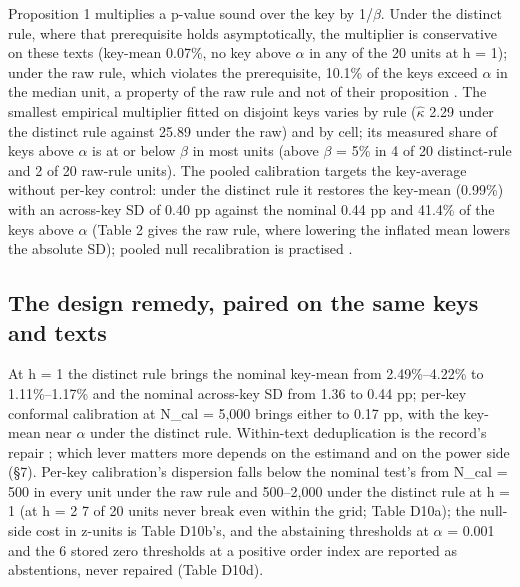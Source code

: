 \documentclass[11pt,letterpaper]{article}
\begin{document}
Proposition 1 multiplies a p-value sound over the key by 1/\ensuremath{\beta}. Under the distinct rule, where that prerequisite holds asymptotically, the multiplier is conservative on these texts (key-mean 0.07\%, no key above \ensuremath{\alpha} in any of the 20 units at h = 1); under the raw rule, which violates the prerequisite, 10.1\% of the keys exceed \ensuremath{\alpha} in the median unit, a property of the raw rule and not of their proposition \citep{gloaguen2026automark}. The smallest empirical multiplier fitted on disjoint keys varies by rule (\ensuremath{\hat{\kappa}} 2.29 under the distinct rule against 25.89 under the raw) and by cell; its measured share of keys above \ensuremath{\alpha} is at or below \ensuremath{\beta} in most units (above \ensuremath{\beta} = 5\% in 4 of 20 distinct-rule and 2 of 20 raw-rule units). The pooled calibration targets the key-average without per-key control: under the distinct rule it restores the key-mean (0.99\%) with an across-key SD of 0.40 pp against the nominal 0.44 pp and 41.4\% of the keys above \ensuremath{\alpha} (Table 2 gives the raw rule, where lowering the inflated mean lowers the absolute SD); pooled null recalibration is practised \citep{lichen2026chainmark, nemecek2026crosslingual}.

\hypertarget{the-design-remedy-paired-on-the-same-keys-and-texts}{%
\subsection{The design remedy, paired on the same keys and texts}\label{the-design-remedy-paired-on-the-same-keys-and-texts}}

At h = 1 the distinct rule brings the nominal key-mean from 2.49\%--4.22\% to 1.11\%--1.17\% and the nominal across-key SD from 1.36 to 0.44 pp; per-key conformal calibration at N\_cal = 5,000 brings either to 0.17 pp, with the key-mean near \ensuremath{\alpha} under the distinct rule. Within-text deduplication is the record's repair \citep{fernandez2023bricks}; which lever matters more depends on the estimand and on the power side (\S{}7). Per-key calibration's dispersion falls below the nominal test's from N\_cal = 500 in every unit under the raw rule and 500--2,000 under the distinct rule at h = 1 (at h = 2 7 of 20 units never break even within the grid; Table D10a); the null-side cost in z-units is Table D10b's, and the abstaining thresholds at \ensuremath{\alpha} = 0.001 and the 6 stored zero thresholds at a positive order index are reported as abstentions, never repaired (Table D10d).
\end{document}
